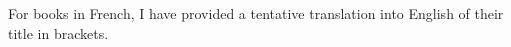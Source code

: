 \documentclass[11pt,a4paper]{article}
\begin{document}
\tableofcontents

\newpage



\newpage



\newpage



\newpage


\newpage



\begin{flushright}
  \begin{relsize}{-2}
    For books in French, I have provided a tentative translation into
    English of their title in brackets.
  \end{relsize}
\end{flushright}

\clearpage

\printindex
\end{document}
